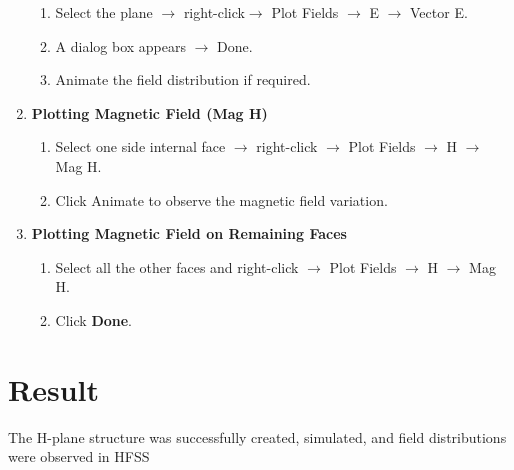 \documentclass[11pt, a4paper]{article}
\begin{document}
\begin{multicols}{2}
\begin{enumerate}[leftmargin=*, itemsep=15pt]
		\begin{enumerate}
		\item Select the plane $\rightarrow$ right-click$\rightarrow$ Plot Fields $\rightarrow$ E $\rightarrow$ Vector E.
			\item A dialog box appears $\rightarrow$ Done.
			\item Animate the field distribution if required.
		\end{enumerate}
	\item \textbf{Plotting Magnetic Field (Mag H)}
		\begin{enumerate}
            \item Select one side internal face $\rightarrow$ right-click $\rightarrow$ Plot Fields $\rightarrow$ H $\rightarrow$ Mag H.
			\item Click Animate to observe the magnetic field variation.
		\end{enumerate}
	\item \textbf{Plotting Magnetic Field on Remaining Faces}
		\begin{enumerate}
		\item Select all the other faces and right-click $\rightarrow$ Plot Fields $\rightarrow$ H $\rightarrow$ Mag H.
        \item Click \textbf{Done}.
		\end{enumerate}
\end{enumerate}
\section*{Result}
The H-plane structure was successfully created,
simulated, and field distributions were observed in
HFSS
\end{multicols}
\end{document}
